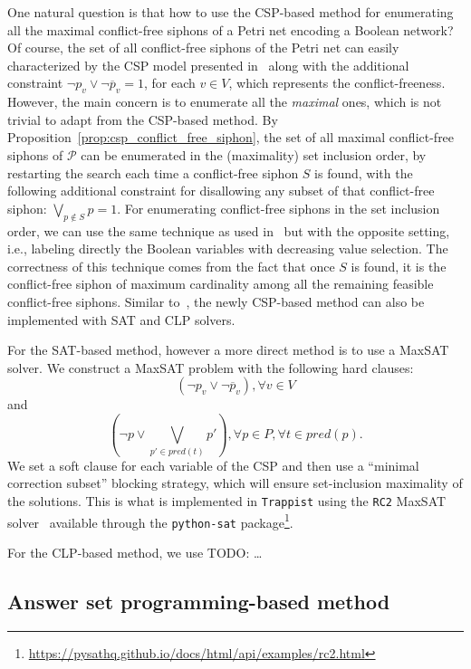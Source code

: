 \documentclass[preprint,12pt]{elsarticle}
\begin{document}
One natural question is that how to use the CSP-based method for enumerating all the maximal conflict-free siphons of a Petri net encoding a Boolean network?
Of course, the set of all conflict-free siphons of the Petri net can easily characterized by the CSP model presented in~\cite{nabli2016enumerating} along with the additional constraint \(\neg p_v \vee \neg \overline{p}_v = 1\), for each \(v \in V\), which represents the conflict-freeness.
However, the main concern is to enumerate all the \emph{maximal} ones, which is not trivial to adapt from the CSP-based method.
By Proposition~\ref{prop:csp_conflict_free_siphon}, the set of all maximal conflict-free siphons of \(\mathcal{P}\) can be enumerated in the (maximality) set inclusion order, by restarting the search each time a conflict-free siphon \(S\) is found, with the following additional constraint for disallowing any subset of that conflict-free siphon: \(\bigvee_{p \not \in S} p = 1\).
For enumerating conflict-free siphons in the set inclusion order, we can use the same technique as used in~\cite{nabli2016enumerating} but with the opposite setting, i.e., labeling directly the Boolean variables with decreasing value selection.
The correctness of this technique comes from the fact that once \(S\) is found, it is the conflict-free siphon of maximum cardinality among all the remaining feasible conflict-free siphons.
Similar to~\cite{nabli2016enumerating}, the newly CSP-based method can also be implemented with SAT and CLP solvers.

For the SAT-based method, however a more direct method is to use a MaxSAT solver.
We construct a MaxSAT problem with the following hard clauses:
\[
  (\neg p_v \vee \neg \overline{p}_v), \forall v \in V
\]
and
\[
  (\neg p \vee \bigvee_{p' \in pred(t)}p'), \forall p \in P, \forall t \in pred(p).
\]
We set a soft clause for each variable of the CSP and then use a ``minimal correction subset'' blocking strategy, which will ensure set-inclusion maximality of the solutions.
This is what is implemented in \texttt{Trappist} using the \texttt{RC2} MaxSAT solver~\cite{DBLP:journals/jsat/IgnatievMM19} available through the \texttt{python-sat} package\footnote{\url{https://pysathq.github.io/docs/html/api/examples/rc2.html}}.

For the CLP-based method, we use TODO: \dots

\subsection{Answer set programming-based method}
\label{subsec:computation_asp}
\end{document}
